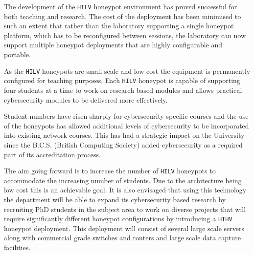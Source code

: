 \documentclass{llncs}
\begin{document}
The development of the \texttt{HILV} honeypot environment has proved successful
for both teaching and research. The cost of the deployment has been minimised
to such an extent that rather than the laboratory supporting a single honeypot
platform, which has to be reconfigured between sessions, the laboratory can now
support multiple honeypot deployments that are highly configurable and
portable.

As the \texttt{HILV} honeypots are small scale and low cost the equipment is
permanently configured for teaching purposes. Each \texttt{HILV} honeypot is
capable of supporting four students at a time to work on research based modules
and allows practical cybersecurity modules to be delivered more effectively.

Student numbers have risen sharply for cybersecurity-specific courses and the
use of the honeypots has allowed additional levels of cybersecurity to be
incorporated into existing network courses. This has had a strategic impact on
the University since the B.C.S. (British Computing Society) added
cybersecurity as a required part of its accreditation process.

The aim going forward is to increase the number of \texttt{HILV} honeypots to
accommodate the increasing number of students. Due to the architecture being
low cost this is an achievable goal. It is also envisaged that using this
technology the department will be able to expand its cybersecurity based
research by recruiting PhD students in the subject area to work on diverse
projects that will require significantly different honeypot configurations by
introducing a \texttt{HIHV} honeypot deployment. This deployment will consist
of several large scale servers along with commercial grade switches and routers
and large scale data capture facilities.




\end{document}

